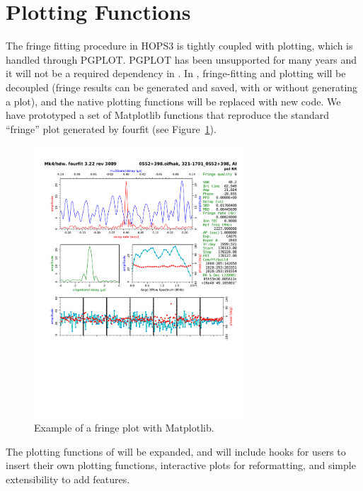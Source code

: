 
\section{Plotting Functions}
\label{sec:plotting}

The fringe fitting procedure in HOPS3 is tightly coupled with plotting, which is handled through PGPLOT. PGPLOT has been unsupported for many years and it will not be a required dependency in \nuHOPS. In \nuHOPS, fringe-fitting and plotting will be decoupled (fringe results can be generated and saved, with or without generating a plot), and the native plotting functions will be replaced with new code. We have prototyped a set of Matplotlib functions that reproduce the standard ``fringe'' plot generated by fourfit (see Figure~\ref{fig:matplotlib-fringe-plot}).

\begin{figure}[h!]
  \begin{center}
    \captionsetup{width=0.6\linewidth}
    \includegraphics[width=0.7\textwidth]{fig/matplotlib-fringe-plot.pdf}
    \caption{Example of a fringe plot with Matplotlib.}
    \label{fig:matplotlib-fringe-plot}
\end{center}
\end{figure}


The plotting functions of \nuHOPS will be expanded, and will include hooks for users to insert their own plotting functions, interactive plots for reformatting, and simple extensibility to add features.
